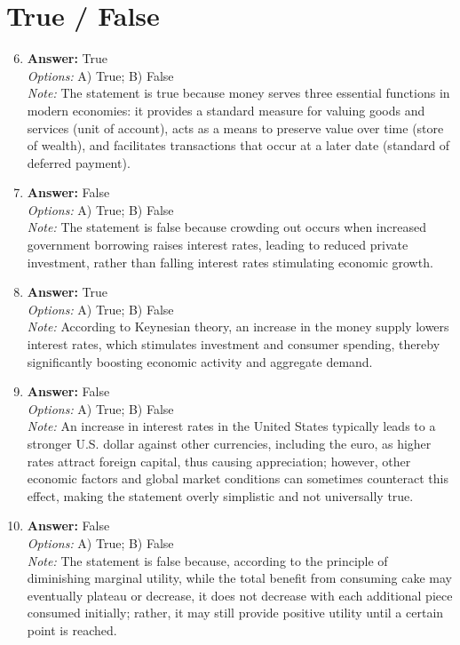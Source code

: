 \documentclass[12pt]{article}
\begin{document}
\section*{True / False}
\begin{enumerate}[label=\arabic*.]
\setcounter{enumi}{5}
\item \textbf{Answer:} True
\\ \textit{Options:} A) True; B) False
\\ \textit{Note:} The statement is true because money serves three essential functions in modern economies: it provides a standard measure for valuing goods and services (unit of account), acts as a means to preserve value over time (store of wealth), and facilitates transactions that occur at a later date (standard of deferred payment).
\item \textbf{Answer:} False
\\ \textit{Options:} A) True; B) False
\\ \textit{Note:} The statement is false because crowding out occurs when increased government borrowing raises interest rates, leading to reduced private investment, rather than falling interest rates stimulating economic growth.
\item \textbf{Answer:} True
\\ \textit{Options:} A) True; B) False
\\ \textit{Note:} According to Keynesian theory, an increase in the money supply lowers interest rates, which stimulates investment and consumer spending, thereby significantly boosting economic activity and aggregate demand.
\item \textbf{Answer:} False
\\ \textit{Options:} A) True; B) False
\\ \textit{Note:} An increase in interest rates in the United States typically leads to a stronger U.S. dollar against other currencies, including the euro, as higher rates attract foreign capital, thus causing appreciation; however, other economic factors and global market conditions can sometimes counteract this effect, making the statement overly simplistic and not universally true.
\item \textbf{Answer:} False
\\ \textit{Options:} A) True; B) False
\\ \textit{Note:} The statement is false because, according to the principle of diminishing marginal utility, while the total benefit from consuming cake may eventually plateau or decrease, it does not decrease with each additional piece consumed initially; rather, it may still provide positive utility until a certain point is reached.
\end{enumerate}
\end{document}
